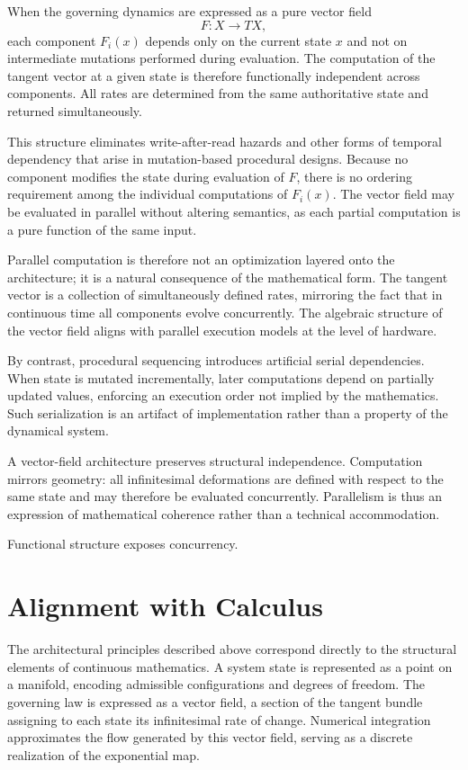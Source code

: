 \documentclass[12pt]{book}
\begin{document}
When the governing dynamics are expressed as a pure vector field
\[
F : X \to TX,
\]
each component $F_i(x)$ depends only on the current state $x$ and not
on intermediate mutations performed during evaluation. The computation
of the tangent vector at a given state is therefore functionally
independent across components. All rates are determined from the same
authoritative state and returned simultaneously.

This structure eliminates write-after-read hazards and other forms of
temporal dependency that arise in mutation-based procedural designs.
Because no component modifies the state during evaluation of $F$,
there is no ordering requirement among the individual computations of
$F_i(x)$. The vector field may be evaluated in parallel without
altering semantics, as each partial computation is a pure function of
the same input.

Parallel computation is therefore not an optimization layered onto the
architecture; it is a natural consequence of the mathematical form.
The tangent vector is a collection of simultaneously defined rates,
mirroring the fact that in continuous time all components evolve
concurrently. The algebraic structure of the vector field aligns with
parallel execution models at the level of hardware.

By contrast, procedural sequencing introduces artificial serial
dependencies. When state is mutated incrementally, later computations
depend on partially updated values, enforcing an execution order not
implied by the mathematics. Such serialization is an artifact of
implementation rather than a property of the dynamical system.

A vector-field architecture preserves structural independence.
Computation mirrors geometry: all infinitesimal deformations are
defined with respect to the same state and may therefore be evaluated
concurrently. Parallelism is thus an expression of mathematical
coherence rather than a technical accommodation.

Functional structure exposes concurrency.
\section{Alignment with Calculus}

The architectural principles described above correspond directly to
the structural elements of continuous mathematics. A system state is
represented as a point on a manifold, encoding admissible configurations
and degrees of freedom. The governing law is expressed as a vector field,
a section of the tangent bundle assigning to each state its
infinitesimal rate of change. Numerical integration approximates the
flow generated by this vector field, serving as a discrete realization
of the exponential map.
\end{document}
